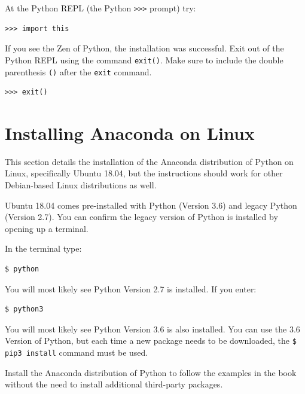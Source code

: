 \documentclass{book}
\begin{document}
At the Python REPL (the Python \lstinline!>>>! prompt) try:

\begin{lstlisting}
>>> import this
\end{lstlisting}

If you see the Zen of Python, the installation was successful. Exit out
of the Python REPL using the command \lstinline!exit()!. Make sure to
include the double parenthesis \lstinline!()! after the \lstinline!exit!
command.

\begin{lstlisting}
>>> exit()
\end{lstlisting}
    




    
        \section{Installing Anaconda on
Linux}\label{installing-anaconda-on-linux}
    




    
        This section details the installation of the Anaconda distribution of
Python on Linux, specifically Ubuntu 18.04, but the instructions should
work for other Debian-based Linux distributions as well.

Ubuntu 18.04 comes pre-installed with Python (Version 3.6) and legacy
Python (Version 2.7). You can confirm the legacy version of Python is
installed by opening up a terminal.

In the terminal type:

\begin{lstlisting}
$ python
\end{lstlisting}

You will most likely see Python Version 2.7 is installed. If you enter:

\begin{lstlisting}
$ python3
\end{lstlisting}

You will most likely see Python Version 3.6 is also installed. You can
use the 3.6 Version of Python, but each time a new package needs to be
downloaded, the \lstinline!$ pip3 install! command must be used.

Install the Anaconda distribution of Python to follow the examples in
the book without the need to install additional third-party packages.
    
\end{document}
